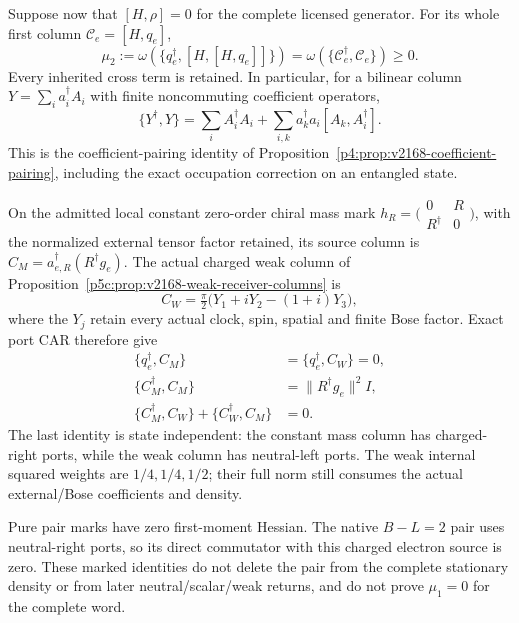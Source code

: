 \documentclass[12pt,a4paper]{article}
\begin{document}
\begin{theorem}
\label{p6:thm:v2189-marked-moment-cancellations}
Suppose now that $[H,\rho]=0$ for the complete licensed generator.
For its whole first column $\mathcal C_e=[H,q_e]$,
\[
 \boxed{\mu_2:=\omega(\{q_e^\dagger,[H,[H,q_e]]\})
       =\omega(\{\mathcal C_e^\dagger,\mathcal C_e\})\ge0.}
\]
Every inherited cross term is retained. In particular, for a bilinear
column $Y=\sum_i a_i^\dagger A_i$ with finite noncommuting coefficient
operators,
\[
 \boxed{\{Y^\dagger,Y\}=\sum_i A_i^\dagger A_i
       +\sum_{i,k}a_k^\dagger a_i[A_k,A_i^\dagger].}
\]
This is the coefficient-pairing identity of
Proposition~\ref{p4:prop:v2168-coefficient-pairing}, including the exact
occupation correction on an entangled state.

On the admitted local constant zero-order chiral mass mark
$h_R=\bigl(\begin{smallmatrix}0&R\\R^\dagger&0\end{smallmatrix}\bigr)$,
with the normalized external tensor factor retained, its source column is
$C_M=a_{e,R}^\dagger(R^\dagger g_e)$. The actual charged weak column of
Proposition~\ref{p5c:prop:v2168-weak-receiver-columns} is
\[
 C_W=\tfrac\pi2\bigl(Y_1+iY_2-(1+i)Y_3\bigr),
\]
where the $Y_j$ retain every actual clock, spin, spatial and finite Bose
factor. Exact port CAR therefore give
\begin{align*}
 \{q_e^\dagger,C_M\}&=\{q_e^\dagger,C_W\}=0,\\
 \{C_M^\dagger,C_M\}&=\|R^\dagger g_e\|^2I,\\
 \{C_M^\dagger,C_W\}+\{C_W^\dagger,C_M\}&=0.
\end{align*}
The last identity is state independent: the constant mass column has
charged-right ports, while the weak column has neutral-left ports.
The weak internal squared weights are $1/4,1/4,1/2$; their full norm still
consumes the actual external/Bose coefficients and density.

Pure pair marks have zero first-moment Hessian. The native $B-L=2$ pair
uses neutral-right ports, so its direct commutator with this charged
electron source is zero. These marked identities do not delete the pair
from the complete stationary density or from later neutral/scalar/weak
returns, and do not prove $\mu_1=0$ for the complete word.
\end{theorem}
\end{document}
